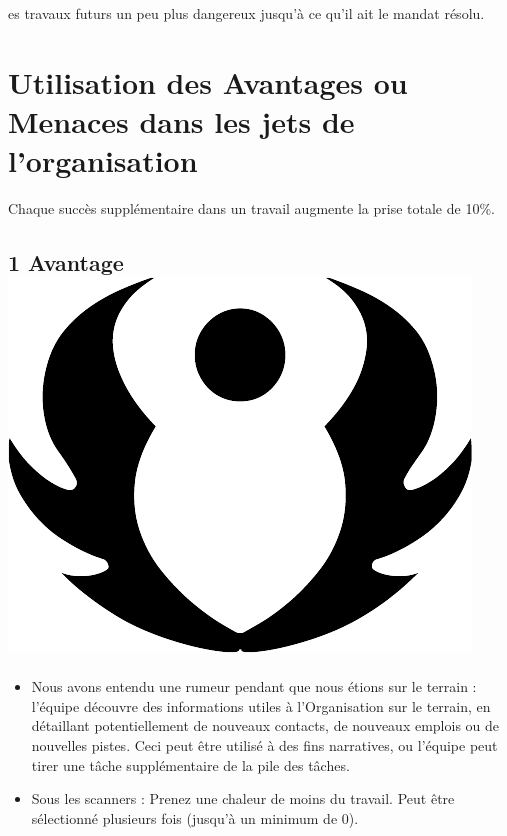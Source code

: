 \documentclass{article}
\begin{document}
es travaux futurs un peu plus dangereux jusqu'à ce qu'il ait le mandat résolu.

\section*{Utilisation des Avantages ou Menaces dans les jets de l’organisation}
Chaque succès supplémentaire dans un travail augmente la prise totale de 10\%.

\subsection*{1 Avantage \includegraphics[height=\fontcharht\font`\B]{result_avantage_advantage}}
\begin{itemize}
	\item Nous avons entendu une rumeur pendant que nous étions sur le terrain : l'équipe découvre des informations utiles à l'Organisation sur le terrain, en détaillant potentiellement de nouveaux contacts, de nouveaux emplois ou de nouvelles pistes. Ceci peut être utilisé à des fins narratives, ou l'équipe peut tirer une tâche supplémentaire de la pile des tâches.
	\item Sous les scanners : Prenez une chaleur de moins du travail. Peut être sélectionné plusieurs fois (jusqu'à un minimum de 0).
\end{itemize}
\end{document}
